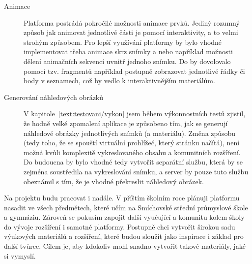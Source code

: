 \begin{description}
  \item[Animace] Platforma postrádá pokročilé možnosti animace prvků.
  Jediný rozumný způsob jak animovat jednotlivé části je pomocí interaktivity, a to velmi strohým způsobem.
  Pro lepší využívání platformy by bylo vhodné implementovat třeba animace skrz snímky a nebo například možnosti dělení animačních sekvencí uvnitř jednoho snímku.
  Do by dovolovalo pomocí tzv. fragmentů například postupně zobrazovat jednotlivé řádky či body v seznamech, což by vedlo k interaktivnějším materiálům.

  \item[Generování náhledových obrázků] V kapitole~\ref{text:testovani/vykon} jsem během výkonnostních testů zjistil, že hodně velké zpomalení aplikace je způsobeno tím, jak se generují náhledové obrázky jednotlivých snímků (a materiálu).
  Změna způsobu (tedy toho, že se spouští virtuální prohlížeč, který stránku načítá), není možná kvůli komplexitě vykreslovaného obsahu a komunitních rozšíření.
  Do budoucna by bylo vhodné tedy vytvořit separátní službu, která by se zejména soustředila na vykreslování snímku, a server by pouze tuto službu obeznámil s tím, že je vhodné překreslit náhledový obrázek.
\end{description}

Na projektu budu pracovat i nadále. 
V příštím školním roce plánuji platformu nasadit ve všech předmětech, které učím na Smíchovské střední průmyslové škole a gymnáziu.
Zároveň se pokusím zapojit další vyučující a komunitu kolem školy do vývoje rozšíření i samotné platformy.
Postupně chci vytvořit širokou sadu výukových materiálů a rozšíření, které budou sloužit jako inspirace i základ pro další tvůrce. 
Cílem je, aby kdokoliv mohl snadno vytvořit takové materiály, jaké si vymyslí.





